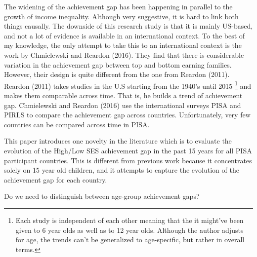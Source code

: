 \documentclass[11pt, a4paper]{article}\usepackage[]{graphicx}\usepackage[]{color}
\begin{document}
The widening of the achievement gap has been happening in parallel to the growth of income inequality. Although very suggestive, it is hard to link both things causally. The downside of this research study is that it is mainly US-based, and not a lot of evidence is available in an international context. To the best of my knowledge, the only attempt to take this to an international context is the work by Chmielewski and Reardon (2016). They find that there is considerable variation in the achievement gap between top and bottom earning families. However, their design is quite different from the one from Reardon (2011). Reardon (2011) takes studies in the U.S starting from the 1940's until 2015 \footnote{Each study is independent of each other meaning that the it might've been given to 6 year olds as well as to 12 year olds. Although the author adjusts for age, the trends can't be generalized to age-specific, but rather in overall terms.} and makes them comparable across time. That is, he builds a trend of achievement gap. Chmielewski and Reardon (2016) use the international surveys PISA and PIRLS to compare the achievement gap across countries. Unfortunately, very few countries can be compared across time in PISA.

This paper introduces one novelty in the literature which is to evaluate the evolution of the High/Low SES achievement gap in the past 15 years for all PISA participant countries. This is different from previous work because it concentrates solely on 15 year old children, and it attempts to capture the evolution of the achievement gap for each country. 

Do we need to distinguish between age-group achievement gaps?
\end{document}
